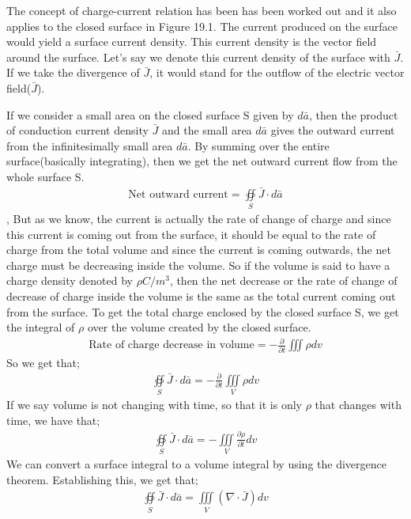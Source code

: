 The concept of charge-current relation has been has been worked out and it also applies to the closed surface in Figure 19.1. The current produced on the surface would yield a surface current density. This current density is the vector field around the surface. Let's say we denote this current density of the surface with $\bar{J}$. If we take the divergence of $\bar{J}$, it would stand for the outflow of the electric vector field($\bar{J}$).

If we consider a small area on the closed surface S given by $d\bar{a}$, then the product of conduction current density $\bar{J}$ and the small area $d\bar{a}$ gives the outward current from the infinitesimally small area $d\bar{a}$. By summing over the entire surface(basically integrating), then we get the net outward current flow from the whole surface S.
\begin{align*}
\text{Net outward current}= \oiint\limits_S\bar{J}\cdot d\bar{a}
\end{align*},
But as we know, the current is actually the rate of change of charge and since this current is coming out from the surface, it should be equal to the rate of charge from the total volume and since the current is coming outwards, the net charge must be decreasing inside the volume. So if the volume is said to have a charge density denoted by $\rho C/m^{3}$, then the net decrease or the rate of change of decrease of charge inside the volume is the same as the total current coming out from the surface. To get the total charge enclosed by the closed surface S, we get the integral of $\rho$ over the volume created by the closed surface.
\begin{align*}
\text{Rate of charge decrease in volume}	= -\frac{\partial}{\partial t}\iiint \rho dv
\end{align*}
So we get that;
\begin{align*}
\oiint\limits_S\bar{J}\cdot d\bar{a} = -\frac{\partial}{\partial t}\iiint\limits_V\rho dv
\end{align*}
If we say volume is not changing with time, so that it is only $\rho$ that changes with time, we have that;
\begin{align*}
\oiint\limits_S\bar{J}\cdot d\bar{a} = -\iiint\limits_V\frac{\partial\rho}{\partial t}dv
\end{align*}
We can convert a surface integral to a volume integral by using the divergence theorem. Establishing this, we get that;
\begin{align*}
\oiint\limits_S\bar{J}\cdot d\bar{a} = \iiint\limits_V(\nabla\cdot\bar{J})dv
\end{align*}
